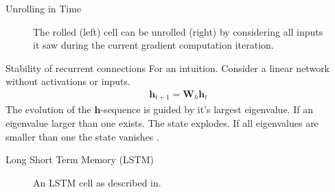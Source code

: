 \documentclass{beamer}
\begin{document}
    \begin{frame}{Unrolling in Time}
      \begin{figure}
        \centering
        
        \caption{The rolled (left) cell can be unrolled (right) by considering all inputs it saw
        during the current gradient computation iteration.}
        \label{fig:unroll_recurrent_cell}
    \end{figure}
    \end{frame}

    \begin{frame}{Stability of recurrent connections}
      For an intuition. Consider a linear network without activations or inputs.
      \begin{align}
        \mathbf{h}_{t+1} = \mathbf{W}_h \mathbf{h}_t
      \end{align}
      The evolution of the $\mathbf{h}$-sequence is guided by it's largest eigenvalue.
      If an eigenvalue larger than one exists. The state explodes.
      If all eigenvalues are smaller than one the state vanishes
      \cite{goodfellow2016deep}.
    \end{frame}

    \begin{frame}{Long Short Term Memory (LSTM)}
      \begin{figure}
        
        \caption{An LSTM cell as described in\cite{hochreiter1997long,greff2016lstm}.}
      \end{figure}

    \end{frame}
\end{document}
